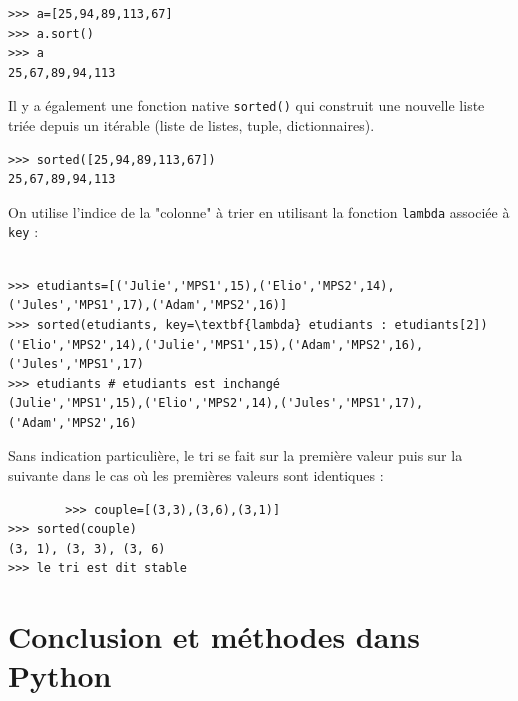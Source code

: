 	\begin{DDbox}{\linewidth}
		\begin{verbatim}
>>> a=[25,94,89,113,67]
>>> a.sort()
>>> a
25,67,89,94,113
		\end{verbatim}
	\end{DDbox}


Il y a également une fonction native \texttt{sorted()} qui construit une nouvelle liste triée depuis un itérable (liste de listes, tuple, dictionnaires).

	\begin{DDbox}{\linewidth}
		\begin{verbatim}
>>> sorted([25,94,89,113,67])
25,67,89,94,113
		\end{verbatim}
	\end{DDbox}

On utilise l'indice de la "colonne" à trier en utilisant la fonction \texttt{lambda} associée à \texttt{key} :


	\begin{DDbox}{\linewidth}
		\begin{verbatim}
		
>>> etudiants=[('Julie','MPS1',15),('Elio','MPS2',14),('Jules','MPS1',17),('Adam','MPS2',16)]
>>> sorted(etudiants, key=\textbf{lambda} etudiants : etudiants[2])
('Elio','MPS2',14),('Julie','MPS1',15),('Adam','MPS2',16),('Jules','MPS1',17)
>>> etudiants # etudiants est inchangé
(Julie','MPS1',15),('Elio','MPS2',14),('Jules','MPS1',17),('Adam','MPS2',16)
		\end{verbatim}
	\end{DDbox}


Sans indication particulière, le tri se fait sur la première valeur puis sur la suivante dans le cas où les premières valeurs sont identiques :

	\begin{DDbox}{\linewidth}
		\begin{verbatim}
		>>> couple=[(3,3),(3,6),(3,1)]
>>> sorted(couple)
(3, 1), (3, 3), (3, 6)
>>> le tri est dit stable
		\end{verbatim}
	\end{DDbox}


\section{Conclusion et méthodes dans Python}


